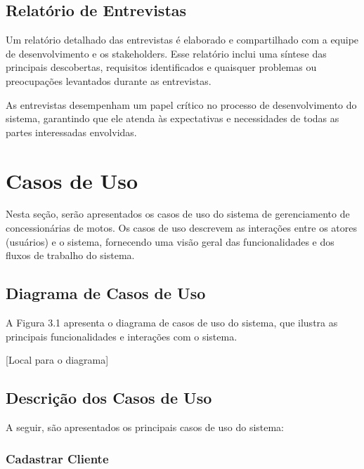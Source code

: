 \subsection{Relatório de Entrevistas}

Um relatório detalhado das entrevistas é elaborado e compartilhado com a equipe de desenvolvimento e os stakeholders. Esse relatório inclui uma síntese das principais descobertas, requisitos identificados e quaisquer problemas ou preocupações levantados durante as entrevistas.

As entrevistas desempenham um papel crítico no processo de desenvolvimento do sistema, garantindo que ele atenda às expectativas e necessidades de todas as partes interessadas envolvidas.



\section{Casos de Uso}

Nesta seção, serão apresentados os casos de uso do sistema de gerenciamento de concessionárias de motos. Os casos de uso descrevem as interações entre os atores (usuários) e o sistema, fornecendo uma visão geral das funcionalidades e dos fluxos de trabalho do sistema.

\subsection{Diagrama de Casos de Uso}

A Figura 3.1 apresenta o diagrama de casos de uso do sistema, que ilustra as principais funcionalidades e interações com o sistema.

[Local para o diagrama]

\subsection{Descrição dos Casos de Uso}

A seguir, são apresentados os principais casos de uso do sistema:

\subsubsection{Cadastrar Cliente}

